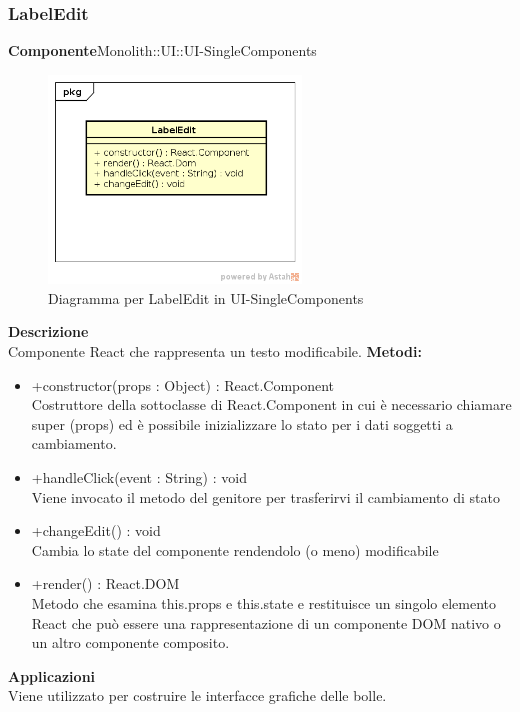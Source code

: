 \subsubsection{LabelEdit}
\textbf{Componente}Monolith::UI::UI-SingleComponents\\
   \FloatBarrier
   \begin{figure}[ht]
   \centering
   \includegraphics[width=0.6\textwidth]{img/single-LabelEdit}
   \caption{{Diagramma per LabelEdit in UI-SingleComponents}}
\end{figure}
\FloatBarrier
\textbf{Descrizione}\\
Componente React che rappresenta un testo modificabile.
\textbf{Metodi:} \begin{itemize}\item +constructor(props : Object) : React.Component \\Costruttore della sottoclasse di React.Component in cui è necessario chiamare super (props) ed è possibile inizializzare lo stato per i dati soggetti a cambiamento.\item +handleClick(event : String) : void  \\Viene invocato il metodo del genitore per trasferirvi il cambiamento di stato\item +changeEdit() : void \\Cambia lo state del componente rendendolo (o meno) modificabile\item +render() : React.DOM \\Metodo che esamina this.props e this.state e restituisce un singolo elemento React che può essere una rappresentazione di un componente DOM nativo o un altro componente composito.\end{itemize} 


\textbf{Applicazioni}\\
Viene utilizzato per costruire le interfacce grafiche delle bolle. 


